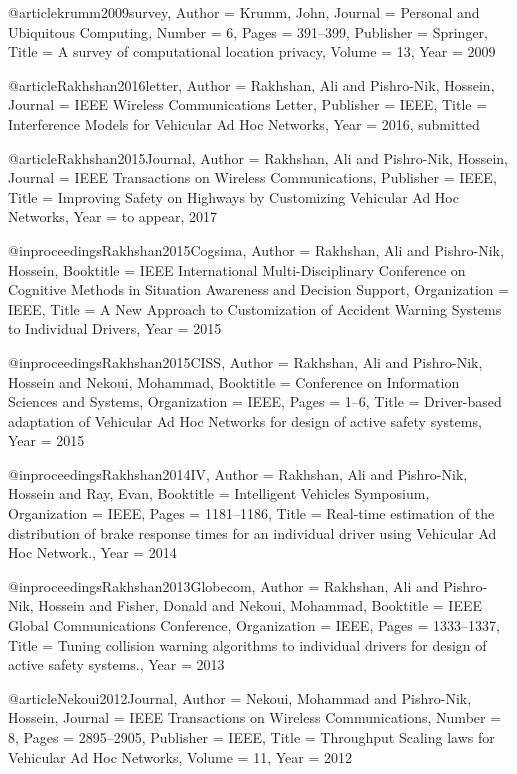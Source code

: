 {{{{{{{	@article{krumm2009survey,
	Author = {Krumm, John},
	Journal = {Personal and Ubiquitous Computing},
	Number = {6},
	Pages = {391--399},
	Publisher = {Springer},
	Title = {A survey of computational location privacy},
	Volume = {13},
	Year = {2009}}
	
	@article{Rakhshan2016letter,
	Author = {Rakhshan, Ali and Pishro-Nik, Hossein},
	Journal = {IEEE Wireless Communications Letter},
	Publisher = {IEEE},
	Title = {Interference Models for Vehicular Ad Hoc Networks},
	Year = {2016, submitted}}
	
	@article{Rakhshan2015Journal,
	Author = {Rakhshan, Ali and Pishro-Nik, Hossein},
	Journal = {IEEE Transactions on Wireless Communications},
	Publisher = {IEEE},
	Title = {Improving Safety on Highways by Customizing Vehicular Ad Hoc Networks},
	Year = {to appear, 2017}}
	
	@inproceedings{Rakhshan2015Cogsima,
	Author = {Rakhshan, Ali and Pishro-Nik, Hossein},
	Booktitle = {IEEE International Multi-Disciplinary Conference on Cognitive Methods in Situation Awareness and Decision Support},
	Organization = {IEEE},
	Title = {A New Approach to Customization of Accident Warning Systems to Individual Drivers},
	Year = {2015}}
	
	@inproceedings{Rakhshan2015CISS,
	Author = {Rakhshan, Ali and Pishro-Nik, Hossein and Nekoui, Mohammad},
	Booktitle = {Conference on Information Sciences and Systems},
	Organization = {IEEE},
	Pages = {1--6},
	Title = {Driver-based adaptation of Vehicular Ad Hoc Networks for design of active safety systems},
	Year = {2015}}
	
	@inproceedings{Rakhshan2014IV,
	Author = {Rakhshan, Ali and Pishro-Nik, Hossein and Ray, Evan},
	Booktitle = {Intelligent Vehicles Symposium},
	Organization = {IEEE},
	Pages = {1181--1186},
	Title = {Real-time estimation of the distribution of brake response times for an individual driver using Vehicular Ad Hoc Network.},
	Year = {2014}}
	
	@inproceedings{Rakhshan2013Globecom,
	Author = {Rakhshan, Ali and Pishro-Nik, Hossein and Fisher, Donald and Nekoui, Mohammad},
	Booktitle = {IEEE Global Communications Conference},
	Organization = {IEEE},
	Pages = {1333--1337},
	Title = {Tuning collision warning algorithms to individual drivers for design of active safety systems.},
	Year = {2013}}
	
	@article{Nekoui2012Journal,
	Author = {Nekoui, Mohammad and Pishro-Nik, Hossein},
	Journal = {IEEE Transactions on Wireless Communications},
	Number = {8},
	Pages = {2895--2905},
	Publisher = {IEEE},
	Title = {Throughput Scaling laws for Vehicular Ad Hoc Networks},
	Volume = {11},
	Year = {2012}}
	
}}}}}}}
